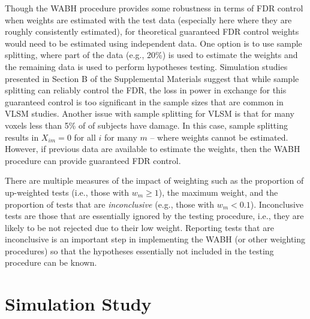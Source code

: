 \documentclass[bimj,fleqn]{w-art}
\theoremstyle{plain}
\theoremstyle{definition}
\begin{document}
Though the WABH procedure provides some robustness in terms of FDR control when weights are estimated with the test data (especially here where they are roughly consistently estimated), for theoretical guaranteed FDR control weights would need to be estimated using independent data. One option is to use sample splitting, where part of the data (e.g., 20\%) is used to estimate the weights and the remaining data is used to perform hypotheses testing. Simulation studies presented in Section B of the Supplemental Materials suggest that while sample splitting can reliably control the FDR, the loss in power in exchange for this guaranteed control is too significant in the sample sizes that are common in VLSM studies. Another issue with sample splitting for VLSM is that for many voxels less than 5\% of of subjects have damage. In this case, sample splitting results in $X_{im}=0$ for all $i$ for many $m$ -- where weights cannot be estimated. However, if previous data are available to estimate the weights, then the WABH procedure can provide guaranteed FDR control.


There are multiple measures of the impact of weighting such as the proportion of up-weighted tests (i.e., those with $w_m \geq 1$), the maximum weight, and the proportion of tests that are \textit{inconclusive} (e.g., those with $w_m < 0.1$). Inconclusive tests are those that are essentially ignored by the testing procedure, i.e., they are likely to be not rejected due to their low weight. Reporting tests that are inconclusive is an important step in implementing the WABH (or other weighting procedures) so that the hypotheses essentially not included in the testing procedure can be known. 

\section{Simulation Study}\label{sec.sim}
\end{document}
